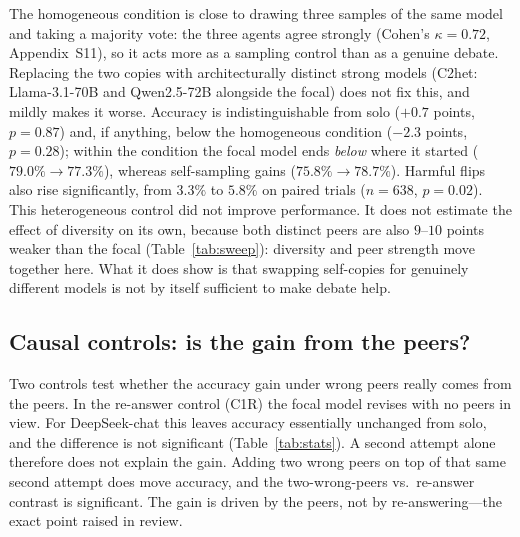 \documentclass[11pt]{article}
\begin{document}
The homogeneous condition is close to drawing three samples of the same
model and taking a majority vote: the three agents agree strongly (Cohen's
$\kappa = 0.72$, Appendix~S11), so it acts more as a
sampling control than as a genuine debate.
Replacing the two copies with architecturally distinct strong models
(C2het: Llama-3.1-70B and Qwen2.5-72B alongside the focal) does not fix this,
and mildly makes it worse.
Accuracy is indistinguishable from solo ($+0.7$ points, $p = 0.87$) and, if
anything, below the homogeneous condition ($-2.3$ points, $p = 0.28$); within
the condition the focal model ends \emph{below} where it started
($79.0\% \rightarrow 77.3\%$), whereas self-sampling gains
($75.8\% \rightarrow 78.7\%$).
Harmful flips also rise significantly, from $3.3\%$ to $5.8\%$ on paired
trials ($n = 638$, $p = 0.02$).
This heterogeneous control did not improve performance. It does not estimate
the effect of diversity on its own, because both distinct peers are also
$9$--$10$ points weaker than the focal (Table~\ref{tab:sweep}): diversity and
peer strength move together here. What it does show is that swapping
self-copies for genuinely different models is not by itself sufficient to make
debate help.




\subsection{Causal controls: is the gain from the peers?}
\label{sub:controls}

Two controls test whether the accuracy gain under wrong peers really comes
from the peers.
In the re-answer control (C1R) the focal model revises with no peers in
view.
For DeepSeek-chat this leaves accuracy essentially unchanged from solo, and
the difference is not significant (Table~\ref{tab:stats}).
A second attempt alone therefore does not explain the gain.
Adding two wrong peers on top of that same second attempt does move
accuracy, and the two-wrong-peers vs.\ re-answer contrast is significant.
The gain is driven by the peers, not by re-answering---the exact point
raised in review.
\end{document}

